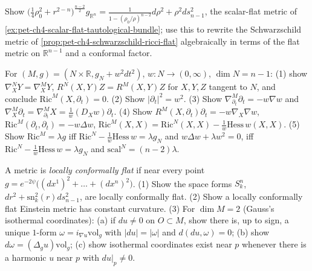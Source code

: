 \begin{remark}
  \label{rem:pet-ch4-ex-15}

  Show
  $\big(\tfrac14\rho_0^2+r^{2-n}\big)^{\frac{n-2}2}g_{\mathbb{R}^n}
  =\tfrac1{1-(\rho_0/\rho)^{n-2}}d\rho^2+\rho^2ds_{n-1}^2$, the scalar-flat
  metric of \cref{ex:pet-ch4-scalar-flat-tautological-bundle}; use this to
  rewrite the Schwarzschild metric of \cref{prop:pet-ch4-schwarzschild-ricci-flat}
  algebraically in terms of the flat metric on $\mathbb{R}^{n-1}$ and a conformal
  factor.
\end{remark}

\begin{remark}
  \label{rem:pet-ch4-ex-16}

  For $(M,g)=(N\times\mathbb{R},g_N+w^2dt^2)$, $w:N\to(0,\infty)$, $\dim N=n-1$: (1)
  show $\nabla^N_XY=\nabla^M_XY$, $R^N(X,Y)Z=R^M(X,Y)Z$ for $X,Y,Z$ tangent to
  $N$, and conclude $\mathrm{Ric}^M(X,\partial_t)=0$. (2) Show $|\partial_t|^2=w^2$.
  (3) Show $\nabla^M_{\partial_t}\partial_t=-w\nabla w$ and
  $\nabla^M_X\partial_t=\nabla^M_{\partial_t}X=\tfrac1w(D_Xw)\partial_t$. (4)
  Show $R^M(X,\partial_t)\partial_t=-w\nabla_X\nabla w$,
  $\mathrm{Ric}^M(\partial_t,\partial_t)=-w\Delta w$,
  $\mathrm{Ric}^M(X,X)=\mathrm{Ric}^N(X,X)-\tfrac1w\mathrm{Hess}\,w(X,X)$. (5) Show
  $\mathrm{Ric}^M=\lambda g$ iff $\mathrm{Ric}^N-\tfrac1w\mathrm{Hess}\,w=\lambda g_N$
  and $w\Delta w+\lambda w^2=0$, iff
  $\mathrm{Ric}^N-\tfrac1w\mathrm{Hess}\,w=\lambda g_N$ and $\mathrm{scal}^N=(n-2)\lambda$.
\end{remark}

\begin{remark}
  \label{rem:pet-ch4-ex-17}

  A metric is \emph{locally conformally flat} if near every point
  $g=e^{-2\psi}\big((dx^1)^2+\dots+(dx^n)^2\big)$. (1) Show the space forms
  $S^n_k$, $dr^2+\mathrm{sn}_k^2(r)ds_{n-1}^2$, are locally conformally flat. (2)
  Show a locally conformally flat Einstein metric has constant curvature. (3)
  For $\dim M=2$ (Gauss's isothermal coordinates): (a) if $du\ne0$ on
  $O\subset M$, show there is, up to sign, a unique $1$-form
  $\omega=i_{\nabla u}\mathrm{vol}_g$ with $|du|=|\omega|$ and
  $d(du,\omega)=0$; (b) show $d\omega=(\Delta_gu)\mathrm{vol}_g$; (c) show
  isothermal coordinates exist near $p$ whenever there is a harmonic $u$ near
  $p$ with $du|_p\ne0$.
\end{remark}

